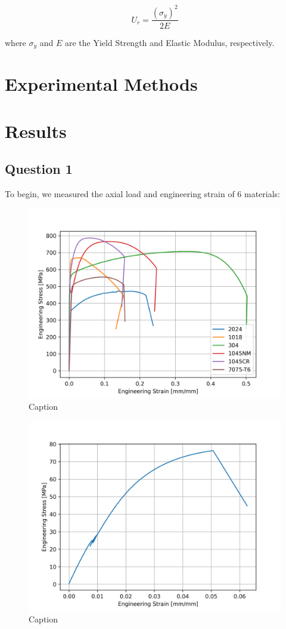 \documentclass{article}
\begin{document}
\begin{equation}
    U_r = \frac{\left(\sigma_y\right)^2}{2E} 
    \label{eq:modresil}
\end{equation}

where $\sigma_y$ and $E$ are the Yield Strength and Elastic Modulus, respectively. 

\section{Experimental Methods}

\newpage
\section{Results}

\subsection{Question 1}
To begin, we measured the axial load and engineering strain of 6 materials: 
\begin{figure}[!h!]
    \centering
    \includegraphics[width=0.5\linewidth]{plots/q1all.png}
    \caption{Caption}
    \label{fig:q1all}
\end{figure}

\begin{figure}[!h!]
    \centering
    \includegraphics[width=0.5\linewidth]{plots/q1_PMMA.png}
    \caption{Caption}
    \label{fig:q1pmma}
\end{figure}
\end{document}
